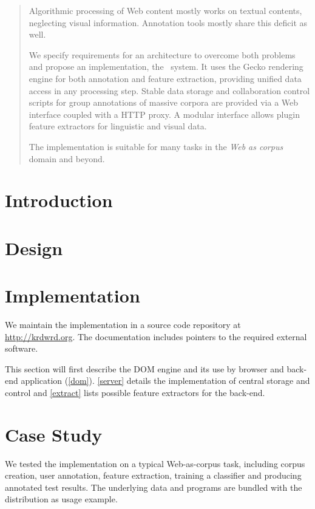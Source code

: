 
\begin{abstract}
Algorithmic processing of Web content mostly works on textual contents, neglecting visual information.
Annotation tools mostly share this deficit as well.

We specify requirements for an architecture to overcome both problems and propose an implementation, the \KrdWrd~system.
It uses the Gecko rendering engine for both annotation and feature extraction, providing unified data access in any processing step.
Stable data storage and collaboration control scripts for group annotations of massive corpora are provided via a Web interface coupled with a HTTP proxy.
A modular interface allows plugin feature extractors for linguistic and visual data.

The implementation is suitable for many tasks in the \textit{Web as corpus} domain and beyond.
\end{abstract}

\section{Introduction}


\section{Design\label{design}}


\section{Implementation\label{impl}}

We maintain the implementation in a source code repository at \url{http://krdwrd.org}.
The documentation includes pointers to the required external software.

This section will first describe the DOM engine and its use by browser and back-end application (\ref{dom}).
\ref{server} details the implementation of central storage and control and \ref{extract} lists possible feature extractors for the back-end.




\section{Case Study\label{casestudy}}

We tested the implementation on a typical Web-as-corpus task, including corpus creation, user annotation, feature extraction, training a classifier and producing annotated test results.
The underlying data and programs are bundled with the {\KrdWrd} distribution as usage example.

